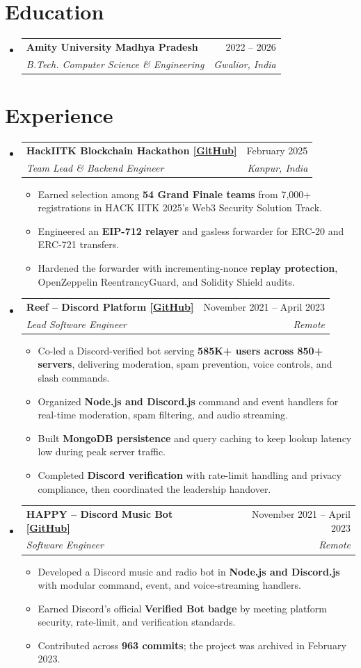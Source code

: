\documentclass[letterpaper,11pt]{article}
\makeatletter
\newcommand{\resumeItem}[1]{\item\small{#1\vspace{-2pt}}}
\newcommand{\resumeSubheading}[4]{\vspace{-1pt}\item\begin{tabular*}{0.97\textwidth}[t]{l@{\extracolsep{\fill}}r}\textbf{#1} & #2 \\\textit{\small #3} & \textit{\small #4} \\\end{tabular*}\vspace{-4pt}}
\newcommand{\resumeSubItem}[1]{\resumeItem{#1}\vspace{-1pt}}
\newcommand{\resumeSubHeadingListStart}{\begin{itemize}[leftmargin=0.15in,label={}]
\setlength\itemsep{0pt}}
\newcommand{\resumeSubHeadingListEnd}{\end{itemize}}
\makeatother
\begin{document}
\section{Education}
\resumeSubHeadingListStart
  \resumeSubheading{Amity University Madhya Pradesh}{2022 -- 2026}{B.Tech. Computer Science \& Engineering}{Gwalior, India}
\resumeSubHeadingListEnd

\section{Experience}
\resumeSubHeadingListStart
  \resumeSubheading{HackIITK Blockchain Hackathon \href{https://github.com/AshishBytes/Gasless-Forwarder}{[GitHub]}}{February 2025}{Team Lead \& Backend Engineer}{Kanpur, India}
  \begin{itemize}[leftmargin=0.15in,label=\textbullet]\setlength\itemsep{2pt}
    \resumeSubItem{Earned selection among \textbf{54 Grand Finale teams} from 7,000+ registrations in HACK IITK 2025's Web3 Security Solution Track.}
    \resumeSubItem{Engineered an \textbf{EIP-712 relayer} and gasless forwarder for ERC-20 and ERC-721 transfers.}
    \resumeSubItem{Hardened the forwarder with incrementing-nonce \textbf{replay protection}, OpenZeppelin ReentrancyGuard, and Solidity Shield audits.}
  \end{itemize}

  \resumeSubheading{Reef -- Discord Platform \href{https://github.com/AshishBytes/Reef-Bot}{[GitHub]}}{November 2021 -- April 2023}{Lead Software Engineer}{Remote}
  \begin{itemize}[leftmargin=0.15in,label=\textbullet]\setlength\itemsep{2pt}
    \resumeSubItem{Co-led a Discord-verified bot serving \textbf{585K+ users across 850+ servers}, delivering moderation, spam prevention, voice controls, and slash commands.}
    \resumeSubItem{Organized \textbf{Node.js and Discord.js} command and event handlers for real-time moderation, spam filtering, and audio streaming.}
    \resumeSubItem{Built \textbf{MongoDB persistence} and query caching to keep lookup latency low during peak server traffic.}
    \resumeSubItem{Completed \textbf{Discord verification} with rate-limit handling and privacy compliance, then coordinated the leadership handover.}
  \end{itemize}

  \resumeSubheading{HAPPY -- Discord Music Bot \href{https://github.com/AshishBytes/HAPPY-bot}{[GitHub]}}{November 2021 -- April 2023}{Software Engineer}{Remote}
  \begin{itemize}[leftmargin=0.15in,label=\textbullet]\setlength\itemsep{2pt}
    \resumeSubItem{Developed a Discord music and radio bot in \textbf{Node.js and Discord.js} with modular command, event, and voice-streaming handlers.}
    \resumeSubItem{Earned Discord's official \textbf{Verified Bot badge} by meeting platform security, rate-limit, and verification standards.}
    \resumeSubItem{Contributed across \textbf{963 commits}; the project was archived in February 2023.}
  \end{itemize}
\resumeSubHeadingListEnd
\end{document}
